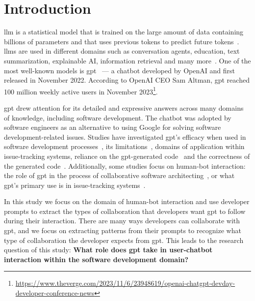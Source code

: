 \chapter{Introduction}\label{introduction}

\Acrfull{llm} is a statistical model that is trained on the large amount of data containing billions of parameters and that uses previous tokens to predict future tokens~\cite{gpt-usage-and-lim}. \Acrshort{llm}s are used in different domains such as conversation agents, education, text summarization, explainable AI, information retrieval and many more~\cite{Dale_2021}. One of the most well-known models is \acrfull{gpt}~\cite{Floridi2020-gpt3paper} --- a chatbot developed by OpenAI and first released in November 2022. According to OpenAI CEO Sam Altman, \acrshort{gpt} reached 100 million weekly active users in November 2023\footnote{\url{https://www.theverge.com/2023/11/6/23948619/openai-chatgpt-devday-developer-conference-news}}. 

\Acrshort{gpt} drew attention for its detailed and expressive answers across many domains of knowledge, including software development. The chatbot was adopted by software engineers as an alternative to using Google for solving software development-related issues. Studies have investigated \acrshort{gpt}'s efficacy when used in software development processes~\cite{Hörnemalm_2023}, its limitations~\cite{gpt-usage-and-lim}, domains of application within issue-tracking systems, reliance on the \acrshort{gpt}-generated code~\cite{gpt-issue-tracking} and the correctness of the generated code~\cite{gpt-code-correctness, zhang2023critical}. Additionally, some studies focus on human-bot interaction: the role of \acrshort{gpt} in the process of collaborative software architecting~\cite{gpt-software-architecture}, or what \acrshort{gpt}'s primary use is in issue-tracking systems~\cite{gpt-issue-tracking}. 

In this study we focus on the domain of human-bot interaction and use developer prompts to extract the types of collaboration that developers want \acrshort{gpt} to follow during their interaction. There are many ways developers can collaborate with \acrshort{gpt}, and we focus on extracting patterns from their prompts to recognize what type of collaboration the developer expects from \acrshort{gpt}. This leads to the research question of this study: \textbf{What role does \acrshort{gpt} take in user-chatbot interaction within the software development domain?}

